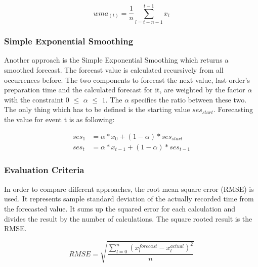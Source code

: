 \begin{center}
\begin{equation}
wma_{(t)}= \frac{1}{n}\sum^{t-1}_{l = t-n-1} x_{l}
\end{equation}
\end{center}

\subsubsection{Simple Exponential Smoothing}\label{subsubsection:Simple Exponential Smoothing}
Another approach is the Simple Exponential Smoothing which returns a smoothed forecast. The forecast value is calculated recursively from all occurrences before. The two components to forecast the next value, last order's preparation time and the calculated forecast for it, are weighted by the factor $\alpha$ with the constraint $0$ $\le$ $\alpha$ $\le$ $1$. The $\alpha$ specifies the ratio between these two. The only thing which has to be defined is the starting value $ses_{start}$.\newline
Forecasting the value for event t is as following:

\begin{equation}
  \begin{align}
  	ses_1 &= \alpha * x_{0} + (1 - \alpha) * ses_{start} \\
  	ses_t&=\alpha*x_{t-1}+(1-\alpha)*ses_{t-1}
  \end{align}
\end{equation}


\subsubsection{Evaluation Criteria}
In order to compare different approaches, the root mean square error (RMSE) is used. It represents sample standard deviation of the actually recorded time from the forecasted value. It sums up the squared error for each calculation and divides the result by the number of calculations.\newline
The square rooted result is the RMSE.
\begin{center}
\begin{equation}
RMSE = \sqrt{\frac{\sum^{n}_{l=0}{(x_{l}^{forecast} - x_{l}^{actual})^{2}}}{n}}
\end{equation}
\end{center}
